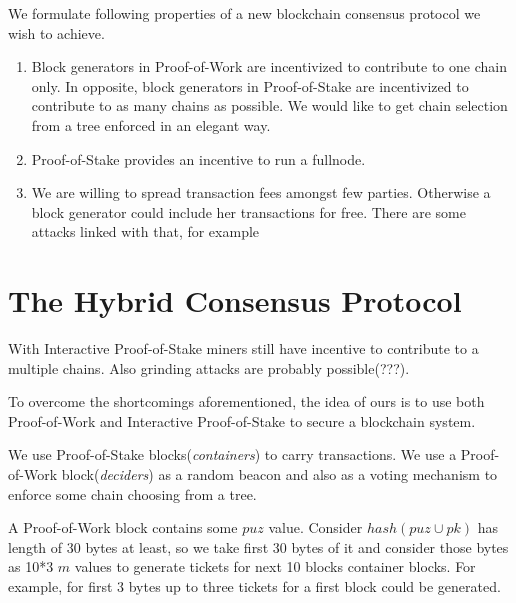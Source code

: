 \documentclass[number,preprint,review]{elsarticle}
\begin{document}
We formulate following properties of a new blockchain consensus protocol we wish to achieve.

\begin{enumerate}

\item Block generators in Proof-of-Work are incentivized to contribute to one chain only. In opposite, block generators in Proof-of-Stake are incentivized to contribute to as many chains as possible. We would like to get chain selection from a tree enforced in an elegant way.

\item Proof-of-Stake provides an incentive to run a fullnode.

\item We are willing to spread transaction fees amongst few parties. Otherwise a block generator could include her transactions for free. There are some attacks linked with that, for example \cite{???}

\end{enumerate}

\section{}




\section{The Hybrid Consensus Protocol}



With Interactive Proof-of-Stake miners still have incentive to contribute to a multiple chains. Also grinding attacks are probably possible(???).


To overcome the shortcomings aforementioned, the idea of ours is to use both Proof-of-Work and Interactive Proof-of-Stake to secure a blockchain system. 

We use Proof-of-Stake blocks(\textit{containers}) to carry transactions. We use a Proof-of-Work block(\textit{deciders}) as a random beacon\cite{???} and also as a voting mechanism to enforce some chain choosing from a tree.

A Proof-of-Work block contains some \(puz\) value\cite{???}. Consider \(hash(puz \cup pk)\) has length of 30 bytes at least, so we take first 30 bytes of it and consider those bytes as 10*3 \(m\) values to generate tickets for next 10 blocks container blocks. For example, for first 3 bytes up to three tickets for a first block could be generated. 
\end{document}
